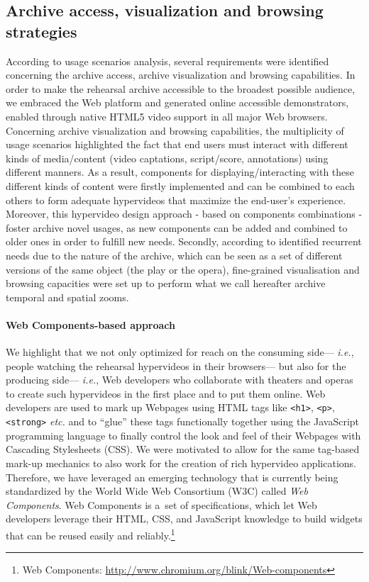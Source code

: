 \documentclass[conference]{IEEEtran}
\begin{document}
\subsection{Archive access, visualization and browsing strategies}
According to usage scenarios analysis, several requirements were identified concerning the archive access, archive visualization and browsing capabilities.
In order to make the rehearsal archive accessible to the broadest possible audience, we embraced the Web platform and generated online accessible demonstrators, enabled through native HTML5 video support in all major Web browsers.\newline
Concerning archive visualization and browsing capabilities, the multiplicity of usage scenarios highlighted the fact that end users must interact with different kinds of media/content (video captations, script/score, annotations) using different manners. As a result, components for displaying/interacting with these different kinds of content were firstly implemented and can be combined to each others to form adequate hypervideos that maximize the end-user's experience. Moreover, this hypervideo design approach - based on components combinations - foster archive novel usages, as new components can be added and combined to older ones in order to fulfill new needs.\newline
Secondly, according to identified recurrent needs due to the nature of the archive, which can be seen as a set of different versions of the same object (the play or the opera), fine-grained visualisation and browsing capacities were set up to perform what we call hereafter archive temporal and spatial zooms.

\paragraph{Web Components-based approach}
We highlight that we not only optimized for reach on the consuming side---%
\emph{i.e.}, people watching the rehearsal hypervideos in their browsers---%
but also for the producing side---%
\emph{i.e.}, Web developers who collaborate with theaters and operas
to create such hypervideos in the first place and to put them online.
Web developers are used to mark up Webpages using HTML tags
like \texttt{<h1>}, \texttt{<p>}, \texttt{<strong>} \emph{etc.}
and to ``glue'' these tags functionally together using the JavaScript programming language
to finally control the look and feel of their Webpages with Cascading Stylesheets (CSS).
We were motivated to allow for the same tag-based mark-up mechanics
to also work for the creation of rich hypervideo applications.
Therefore, we have leveraged an emerging technology
that is currently being standardized by the World Wide Web Consortium (W3C)
called \emph{Web Components}.
Web Components is a~set of specifications, which let Web developers leverage
their HTML, CSS, and JavaScript knowledge to build widgets
that can be reused easily and reliably.\footnote{Web Components:
\url{http://www.chromium.org/blink/Web-components}}
\end{document}
